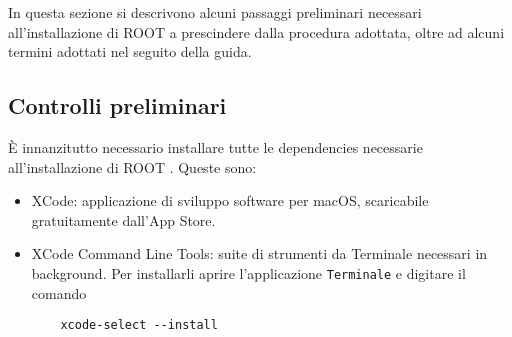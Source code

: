 In questa sezione si descrivono alcuni passaggi preliminari necessari all'installazione di ROOT a prescindere dalla procedura adottata, oltre ad alcuni termini adottati nel seguito della guida.

\subsection{Controlli preliminari}
\label{sec:prelim-checks}
È innanzitutto necessario installare tutte le dependencies necessarie all'installazione di ROOT \cite{root_required_dependecies}. Queste sono:
\begin{itemize}
    \item XCode: applicazione di sviluppo software per macOS, scaricabile gratuitamente dall'App Store.
    \item XCode Command Line Tools: suite di strumenti da Terminale necessari in background. Per installarli aprire l'applicazione \texttt{Terminale} e digitare il comando
    \begin{verbatim}
    xcode-select --install
    \end{verbatim}
\end{itemize}

